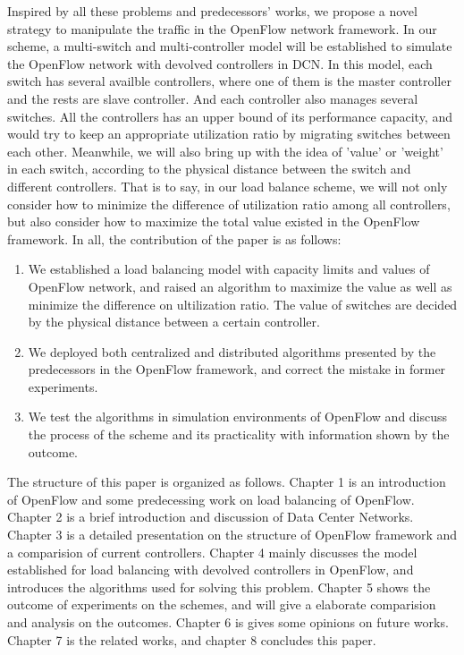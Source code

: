 Inspired by all these problems and predecessors' works, we propose a novel strategy to manipulate the traffic in the OpenFlow network framework. In our scheme, a multi-switch and multi-controller model will be established to simulate the OpenFlow network with devolved controllers in DCN. In this model, each switch has several availble controllers, where one of them is the master controller and the rests are slave controller. And each controller also manages several switches. All the controllers has an upper bound of its performance capacity, and would try to keep an appropriate utilization ratio by migrating switches between each other. Meanwhile, we will also bring up with the idea of 'value' or 'weight' in each switch, according to the physical distance between the switch and different controllers. That is to say, in our load balance scheme, we will not only consider how to minimize the difference of utilization ratio among all controllers, but also consider how to maximize the total value existed in the OpenFlow framework. In all, the contribution of the paper is as follows:
\begin{enumerate}
\item We established a load balancing model with capacity limits and values of OpenFlow network, and raised an algorithm to maximize the value as well as minimize the difference on ultilization ratio. The value of switches are decided by the physical distance between a certain controller.
\item We deployed both centralized and distributed algorithms presented by the predecessors in the OpenFlow framework, and correct the mistake in former experiments.
\item We test the algorithms in simulation environments of OpenFlow and discuss the process of the scheme and its practicality with information shown by the outcome. 
\end{enumerate}

The structure of this paper is organized as follows. Chapter 1 is an introduction of OpenFlow and some predecessing work on load balancing of OpenFlow. Chapter 2 is a brief introduction and discussion of Data Center Networks. Chapter 3 is a detailed presentation on the structure of OpenFlow framework and a comparision of current controllers. Chapter 4 mainly discusses the model established for load balancing with devolved controllers in OpenFlow, and introduces the algorithms used for solving this problem. Chapter 5 shows the outcome of experiments on the schemes, and will give a elaborate comparision and analysis on the outcomes. Chapter 6 is gives some opinions on future works. Chapter 7 is the related works, and chapter 8 concludes this paper.

